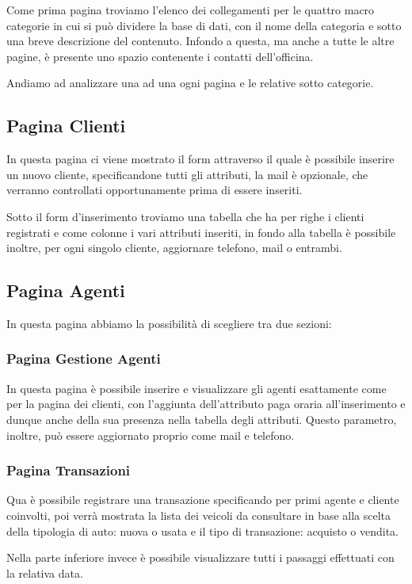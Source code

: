 \documentclass[a4paper,12pt]{report}
\begin{document}
Come prima pagina troviamo l'elenco dei collegamenti per le quattro macro categorie in cui si può dividere la base 
%
di dati, con il nome della categoria e sotto una breve descrizione del contenuto. 
%
Infondo a questa, ma anche a tutte le altre pagine, è presente uno spazio contenente i contatti dell'officina.

Andiamo ad analizzare una ad una ogni pagina e le relative sotto categorie.

\subsection*{Pagina Clienti}
In questa pagina ci viene mostrato il form attraverso il quale è possibile inserire un nuovo cliente, specificandone
%
tutti gli attributi, la mail è opzionale, che verranno controllati opportunamente prima di essere inseriti.

Sotto il form d'inserimento troviamo una tabella che ha per righe i clienti registrati e come colonne i vari attributi	
%
inseriti, in fondo alla tabella è possibile inoltre, per ogni singolo cliente, aggiornare telefono, mail o entrambi.

\subsection*{Pagina Agenti}
In questa pagina abbiamo la possibilità di scegliere tra due sezioni:

\subsubsection*{Pagina Gestione Agenti}
In questa pagina è possibile inserire e visualizzare gli agenti esattamente come per la pagina dei clienti, con 
%
l'aggiunta dell'attributo paga oraria all'inserimento e dunque anche della sua presenza nella tabella degli attributi.
%
Questo parametro, inoltre, può essere aggiornato proprio come mail e telefono.

\subsubsection*{Pagina Transazioni}
Qua è possibile registrare una transazione specificando per primi agente e cliente coinvolti, poi verrà mostrata la lista
%
dei veicoli da consultare in base alla scelta della tipologia di auto: nuova o usata e il tipo di transazione: acquisto o vendita.

Nella parte inferiore invece è possibile visualizzare tutti i passaggi effettuati con la relativa data.
\end{document}
